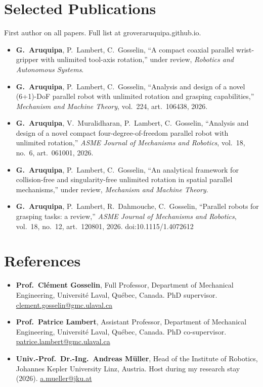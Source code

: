 \documentclass[10pt,letterpaper]{article}
\begin{document}
\section{Selected Publications}
{\small First author on all papers. Full list at groveraruquipa.github.io.}\par\vspace{2pt}
\begin{itemize}
\item \textbf{G.~Aruquipa}, P.~Lambert, C.~Gosselin, ``A compact coaxial parallel wrist-gripper with unlimited tool-axis rotation,'' under review, \emph{Robotics and Autonomous Systems}.
\item \textbf{G.~Aruquipa}, P.~Lambert, C.~Gosselin, ``Analysis and design of a novel (6+1)-DoF parallel robot with unlimited rotation and grasping capabilities,'' \emph{Mechanism and Machine Theory}, vol.~224, art.~106438, 2026.
\item \textbf{G.~Aruquipa}, V.~Muralidharan, P.~Lambert, C.~Gosselin, ``Analysis and design of a novel compact four-degree-of-freedom parallel robot with unlimited rotation,'' \emph{ASME Journal of Mechanisms and Robotics}, vol.~18, no.~6, art.~061001, 2026.
\item \textbf{G.~Aruquipa}, P.~Lambert, C.~Gosselin, ``An analytical framework for collision-free and singularity-free unlimited rotation in spatial parallel mechanisms,'' under review, \emph{Mechanism and Machine Theory}.
\item \textbf{G.~Aruquipa}, P.~Lambert, R.~Dahmouche, C.~Gosselin, ``Parallel robots for grasping tasks: a review,'' \emph{ASME Journal of Mechanisms and Robotics}, vol.~18, no.~12, art.~120801, 2026. doi:10.1115/1.4072612
\end{itemize}

\section{References}
\begin{itemize}
\item \textbf{Prof.~Cl\'ement Gosselin}, Full Professor, Department of Mechanical Engineering, Universit\'e Laval, Qu\'ebec,
Canada. PhD supervisor. \href{mailto:clement.gosselin@gmc.ulaval.ca}{clement.gosselin@gmc.ulaval.ca}
\item \textbf{Prof.~Patrice Lambert}, Assistant Professor, Department of Mechanical Engineering, Universit\'e Laval,
Qu\'ebec, Canada. PhD co-supervisor. \href{mailto:patrice.lambert@gmc.ulaval.ca}{patrice.lambert@gmc.ulaval.ca}
\item \textbf{Univ.-Prof.~Dr.-Ing.~Andreas M\"uller}, Head of the Institute of Robotics, Johannes Kepler University Linz,
Austria. Host during my research stay (2026). \href{mailto:a.mueller@jku.at}{a.mueller@jku.at}
\end{itemize}
\end{document}

